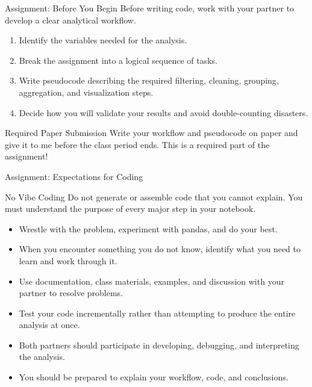\documentclass[11pt,aspectratio=43]{beamer}
\begin{document}
{\begin{frame}{Assignment: Before You Begin}
  Before writing code, work with your partner to develop a clear analytical workflow.

  \begin{enumerate}
    \item Identify the variables needed for the analysis.
    \item Break the assignment into a logical sequence of tasks.
    \item Write pseudocode describing the required filtering, cleaning, grouping, aggregation, and visualization steps.
    \item Decide how you will validate your results and avoid double-counting disasters.
  \end{enumerate}

  \begin{alertblock}{Required Paper Submission}
    Write your workflow and pseudocode on paper and give it to me before the class period ends. This is a required part of the assignment!
  \end{alertblock}
\end{frame}


\begin{frame}{Assignment: Expectations for Coding}
  \small

  \begin{alertblock}{No Vibe Coding}
    Do not generate or assemble code that you cannot explain. You must understand the purpose of every major step in your notebook.
  \end{alertblock}

  \begin{itemize}
    \item Wrestle with the problem, experiment with pandas, and do your best.
    \item When you encounter something you do not know, identify what you need to learn and work through it.
    \item Use documentation, class materials, examples, and discussion with your partner to resolve problems.
    \item Test your code incrementally rather than attempting to produce the entire analysis at once.
    \item Both partners should participate in developing, debugging, and interpreting the analysis.
    \item You should be prepared to explain your workflow, code, and conclusions.
  \end{itemize}
\end{frame}


}
\end{document}
